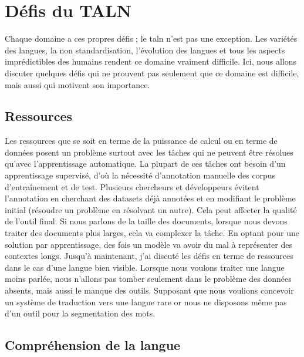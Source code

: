 \documentclass{KodeBook}
\begin{document}
\section{Défis du TALN}

Chaque domaine a ces propres défis ; le \ac{taln} n'est pas une exception. 
Les variétés des langues, la non standardisation, l'évolution des langues et tous les aspects imprédictibles des humains rendent ce domaine vraiment difficile.
Ici, nous allons discuter quelques défis qui ne prouvent pas seulement que ce domaine est difficile, mais aussi qui motivent son importance.

\subsection{Ressources}

Les ressources que se soit en terme de la puissance de calcul ou en terme de données posent un problème surtout avec les tâches qui ne peuvent être résolues qu'avec l'apprentissage automatique.
La plupart de ces tâches ont besoin d'un apprentissage supervisé, d'où la nécessité d'annotation manuelle des corpus d'entraînement et de test. 
Plusieurs chercheurs et développeurs évitent l'annotation en cherchant des datasets déjà annotées et en modifiant le problème initial (résoudre un problème en résolvant un autre). 
Cela peut affecter la qualité de l'outil final. 
Si nous parlons de la taille des documents, lorsque nous devons traiter des documents plus larges, cela va complexer la tâche. 
En optant pour une solution par apprentissage, des fois un modèle va avoir du mal à représenter des contextes longs. 
Jusqu'à maintenant, j'ai discuté les défis en terme de ressources dans le cas d'une langue bien visible. 
Lorsque nous voulons traiter une langue moins parlée, nous n'allons pas tomber seulement dans le problème des données absents, mais aussi le manque des outils. 
Supposant que nous voulions concevoir un système de traduction vers une langue rare or nous ne disposons même pas d'un outil pour la segmentation des mots.

\subsection{Compréhension de la langue}
\end{document}
